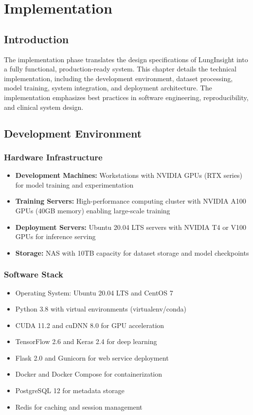 \chapter{Implementation}\thispagestyle{empty}
\graphicspath{{Chapter4/figures/}}
{

\section{Introduction}

The implementation phase translates the design specifications of LungInsight into a fully functional, production-ready system. This chapter details the technical implementation, including the development environment, dataset processing, model training, system integration, and deployment architecture. The implementation emphasizes best practices in software engineering, reproducibility, and clinical system design.

\section{Development Environment}

\subsection{Hardware Infrastructure}

\begin{itemize}
    \item \textbf{Development Machines:} Workstations with NVIDIA GPUs (RTX series) for model training and experimentation
    \item \textbf{Training Servers:} High-performance computing cluster with NVIDIA A100 GPUs (40GB memory) enabling large-scale training
    \item \textbf{Deployment Servers:} Ubuntu 20.04 LTS servers with NVIDIA T4 or V100 GPUs for inference serving
    \item \textbf{Storage:} NAS with 10TB capacity for dataset storage and model checkpoints
\end{itemize}

\subsection{Software Stack}

\begin{itemize}
    \item Operating System: Ubuntu 20.04 LTS and CentOS 7
    \item Python 3.8 with virtual environments (virtualenv/conda)
    \item CUDA 11.2 and cuDNN 8.0 for GPU acceleration
    \item TensorFlow 2.6 and Keras 2.4 for deep learning
    \item Flask 2.0 and Gunicorn for web service deployment
    \item Docker and Docker Compose for containerization
    \item PostgreSQL 12 for metadata storage
    \item Redis for caching and session management
\end{itemize}

}
